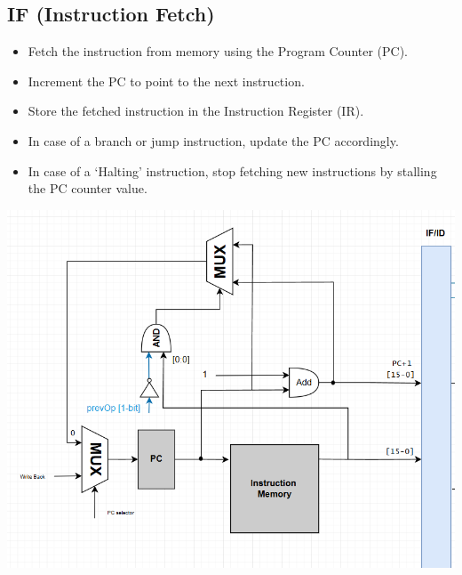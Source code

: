 \documentclass{report}
\begin{document}
\subsection*{IF (Instruction Fetch)}
\begin{minipage}{0.6\textwidth}
\begin{itemize}
    \item Fetch the instruction from memory using the Program Counter (PC).
    \item Increment the PC to point to the next instruction.
    \item Store the fetched instruction in the Instruction Register (IR).
    \item In case of a branch or jump instruction, update the PC accordingly.
    \item In case of a `Halting' instruction, stop fetching new instructions by stalling the PC counter value.
\end{itemize}
\end{minipage}
\begin{minipage}{0.35\textwidth}
\begin{center}
    \includegraphics[width=\textwidth]{./assets/IF.png}
\end{center}
\end{minipage}
\end{document}
